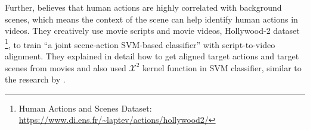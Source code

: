Further, \citet{marszalek2009actions} believes that human actions are highly correlated with background scenes, which means the context of the scene can help identify human actions in videos.
They creatively use movie scripts and movie videos, Hollywood-2 dataset \footnote{Human Actions and Scenes Dataset: \url{https://www.di.ens.fr/~laptev/actions/hollywood2/}}, to train ``a joint scene-action SVM-based classifier'' with script-to-video alignment.
They explained in detail how to get aligned target actions and target scenes from movies and also used $\mathcal{X}^2$ kernel function in SVM classifier, similar to the research by \citet{schuldt2004recognizing}.

\citet{Soomro2014}